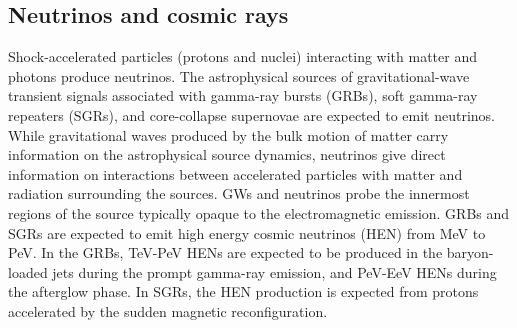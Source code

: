 %
% 

\subsection{Neutrinos and cosmic rays}

Shock-accelerated particles (protons and nuclei) interacting with matter and photons produce neutrinos. The astrophysical sources of gravitational-wave transient signals associated with gamma-ray bursts (GRBs), soft gamma-ray repeaters (SGRs), and core-collapse supernovae are expected to emit neutrinos. While gravitational waves produced by the bulk motion of matter carry information on the astrophysical source dynamics, neutrinos give direct information on interactions between accelerated particles with matter and radiation surrounding the sources. GWs and neutrinos probe the innermost regions of the source typically opaque to the electromagnetic emission. GRBs and SGRs are expected to emit high energy cosmic neutrinos (HEN) from MeV to PeV. In the GRBs, TeV-PeV HENs are expected to be produced in the baryon-loaded jets during the prompt gamma-ray emission, and PeV-EeV HENs during the afterglow phase. In SGRs, the HEN production is expected from protons accelerated by the sudden magnetic reconfiguration. 

